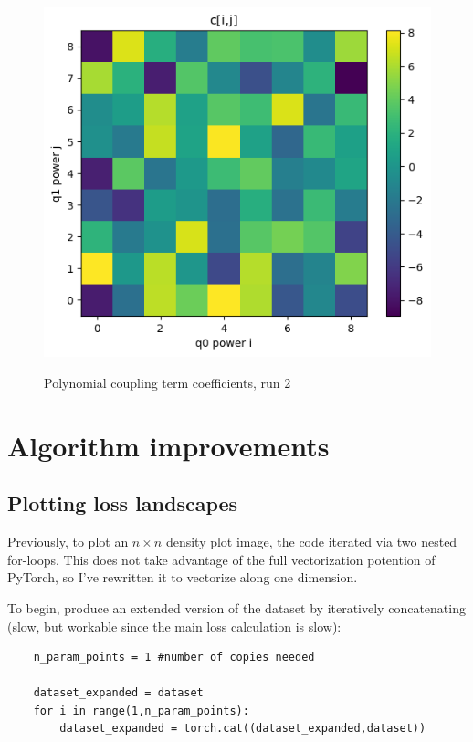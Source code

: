 \documentclass[]{article}
\begin{document}
\begin{figure}[H]
	\caption{Polynomial coupling term coefficients, run 2}
	\centering
	\includegraphics[scale=0.60]{poly-coupling-parameters-3.png}
	\label{fig:poly-coupling-parameters-3}
\end{figure}

\newpage
\section{Algorithm improvements}

\subsection{Plotting loss landscapes}
Previously, to plot an $n\times n$ density plot image, the code iterated via two nested for-loops. This does not take advantage of the full vectorization potention of PyTorch, so I've rewritten it to vectorize along one dimension.

To begin, produce an extended version of the dataset by iteratively concatenating (slow, but workable since the main loss calculation is slow):

\begin{lstlisting}
	n_param_points = 1 #number of copies needed
	
	dataset_expanded = dataset
	for i in range(1,n_param_points):
		dataset_expanded = torch.cat((dataset_expanded,dataset))
\end{lstlisting}
\end{document}
